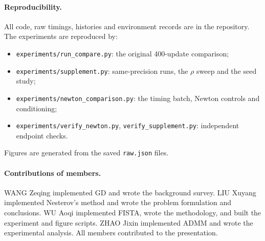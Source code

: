 \documentclass{article}
\begin{document}
\paragraph{Reproducibility.}
All code, raw timings, histories and environment records are in the repository. The experiments are reproduced by:
\begin{itemize}
\item \texttt{experiments/run\_compare.py}: the original 400-update comparison;
\item \texttt{experiments/supplement.py}: same-precision runs, the $\rho$ sweep and the seed study;
\item \texttt{experiments/newton\_comparison.py}: the timing batch, Newton controls and conditioning;
\item \texttt{experiments/verify\_newton.py}, \texttt{verify\_supplement.py}: independent endpoint checks.
\end{itemize}
Figures are generated from the saved \texttt{raw.json} files.

\paragraph{Contributions of members.}
WANG Zeqing implemented GD and wrote the background survey. LIU Xuyang implemented Nesterov's method and wrote the problem formulation and conclusions. WU Aoqi implemented FISTA, wrote the methodology, and built the experiment and figure scripts. ZHAO Jixin implemented ADMM and wrote the experimental analysis. All members contributed to the presentation.



\end{document}
